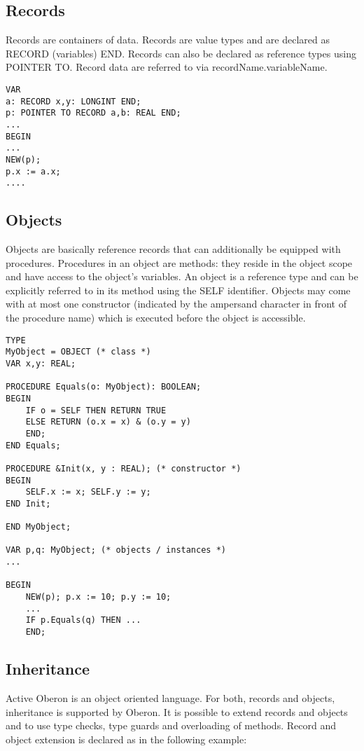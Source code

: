 \documentclass[a4paper,11pt]{article}
\begin{document}
\subsection{Records}
Records are containers of data. Records are value types and are declared as RECORD (variables) END. Records can also be declared as reference types using POINTER TO. Record data are referred to via recordName.variableName.
\begin{lstlisting}[language=Oberon,frame=none]
VAR
a: RECORD x,y: LONGINT END;
p: POINTER TO RECORD a,b: REAL END;
...
BEGIN
...
NEW(p);
p.x := a.x;
....
\end{lstlisting}

\subsection{Objects}
Objects are basically reference records that can additionally be equipped with procedures. Procedures in an object are methods: they reside in the object scope and have access to the object's variables. An object is a reference type and can be explicitly referred to in its method using the SELF identifier. Objects may come with at most one constructor (indicated by the ampersand character in front of the procedure name) which is executed before the
object is accessible.

\begin{lstlisting}[language=Oberon,frame=none]
TYPE
MyObject = OBJECT (* class *)
VAR x,y: REAL;

PROCEDURE Equals(o: MyObject): BOOLEAN;
BEGIN
    IF o = SELF THEN RETURN TRUE
    ELSE RETURN (o.x = x) & (o.y = y)
    END;
END Equals;

PROCEDURE &Init(x, y : REAL); (* constructor *)
BEGIN
    SELF.x := x; SELF.y := y;
END Init;

END MyObject;

VAR p,q: MyObject; (* objects / instances *)
...

BEGIN
    NEW(p); p.x := 10; p.y := 10;
    ...
    IF p.Equals(q) THEN ...
    END;
\end{lstlisting}

\subsection{Inheritance}
Active Oberon is an object oriented language. For both, records and objects, inheritance is supported by Oberon. It is possible to extend records and objects and to use type checks, type guards and overloading of methods.
Record and object extension is declared as in the following example:
\end{document}
